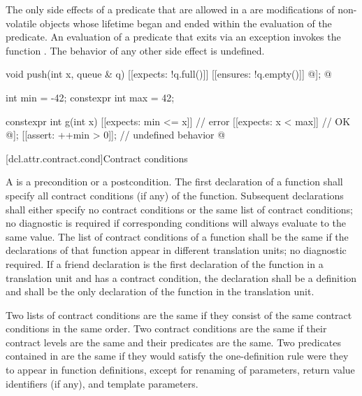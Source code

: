 \pnum
The only side effects of a predicate
that are allowed in a 
are modifications of non-volatile objects
whose lifetime began and ended within the evaluation of the predicate.
An evaluation of a predicate that exits via an exception
invokes the function .
The behavior of any other side effect is undefined.
\begin{example}
\begin{codeblock}
void push(int x, queue & q)
  [[expects: !q.full()]]
  [[ensures: !q.empty()]]
{
  @\commentellip@
  [[assert: q.is_valid()]];
  @\commentellip@
}

int min = -42;
constexpr int max = 42;

constexpr int g(int x)
  [[expects: min <= x]]                         // error
  [[expects: x < max]]                          // OK
{
  @\commentellip@
  [[assert: 2*x < max]];
  [[assert: ++min > 0]];                        // undefined behavior
  @\commentellip@
}
\end{codeblock}
\end{example}

[dcl.attr.contract.cond]{Contract conditions}

\pnum
A  is a precondition or a postcondition.
The first declaration of a function shall specify
all contract conditions (if any) of the function.
Subsequent declarations shall either specify no contract conditions
or the same list of contract conditions;
no diagnostic is required
if corresponding conditions will always evaluate to the same value.
The list of contract conditions of a function shall be the same
if the declarations of that function appear in different translation units;
no diagnostic required.
If a friend declaration
is the first declaration of the function in a translation unit
and has a contract condition,
the declaration shall be a definition and
shall be the only declaration of the function in the translation unit.

\pnum
Two lists of contract conditions are the same
if they consist of the same contract conditions in the same order.
Two contract conditions are the same
if their contract levels are the same and their predicates are the same.
Two predicates contained in 
are the same
if they would satisfy the one-definition rule
were they to appear in function definitions,
except for renaming of parameters,
return value identifiers (if any),
and template parameters.

